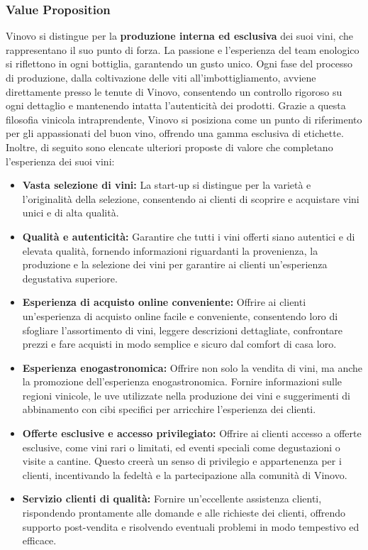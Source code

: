 \documentclass[12pt, a4paper]{article}
\newcommand{\meskip}{\medskip \\}
\begin{document}
\subsubsection{Value Proposition}
Vinovo si distingue per la \textbf{produzione interna ed esclusiva} dei suoi vini, che rappresentano il suo punto di forza. La passione e l'esperienza del team enologico si riflettono in ogni bottiglia, garantendo un gusto unico. Ogni fase del processo di produzione, dalla coltivazione delle viti all'imbottigliamento, avviene direttamente presso le tenute di Vinovo, consentendo un controllo rigoroso su ogni dettaglio e mantenendo intatta l'autenticità dei prodotti. Grazie a questa filosofia vinicola intraprendente, Vinovo si posiziona come un punto di riferimento per gli appassionati del buon vino, offrendo una gamma esclusiva di etichette.\meskip
Inoltre, di seguito sono elencate ulteriori proposte di valore che completano l'esperienza dei suoi vini:
\begin{itemize}
    \item \textbf{Vasta selezione di vini:} La start-up si distingue per la varietà e l'originalità della selezione, consentendo ai clienti di scoprire e acquistare vini unici e di alta qualità.
    \item \textbf{Qualità e autenticità:} Garantire che tutti i vini offerti siano autentici e di elevata qualità, fornendo informazioni riguardanti la provenienza, la produzione e la selezione dei vini per garantire ai clienti un'esperienza degustativa superiore.
    \item \textbf{Esperienza di acquisto online conveniente:} Offrire ai clienti un'esperienza di acquisto online facile e conveniente, consentendo loro di sfogliare l'assortimento di vini, leggere descrizioni dettagliate, confrontare prezzi e fare acquisti in modo semplice e sicuro dal comfort di casa loro.
    \item \textbf{Esperienza enogastronomica:} Offrire non solo la vendita di vini, ma anche la promozione dell'esperienza enogastronomica. Fornire informazioni sulle regioni vinicole, le uve utilizzate nella produzione dei vini e suggerimenti di abbinamento con cibi specifici per arricchire l'esperienza dei clienti.
    \item \textbf{Offerte esclusive e accesso privilegiato:} Offrire ai clienti accesso a offerte esclusive, come vini rari o limitati, ed eventi speciali come degustazioni o visite a cantine. Questo creerà un senso di privilegio e appartenenza per i clienti, incentivando la fedeltà e la partecipazione alla comunità di Vinovo.
    \item \textbf{Servizio clienti di qualità:} Fornire un'eccellente assistenza clienti, rispondendo prontamente alle domande e alle richieste dei clienti, offrendo supporto post-vendita e risolvendo eventuali problemi in modo tempestivo ed efficace.
\end{itemize}
\end{document}
